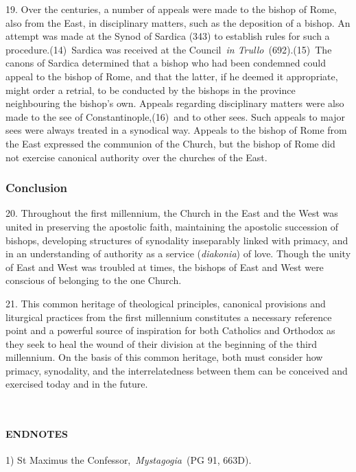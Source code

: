 19. Over the centuries, a number of appeals were made to the bishop of
Rome, also from the East, in disciplinary matters, such as the
deposition of a bishop. An attempt was made at the Synod of Sardica
(343) to establish rules for such a procedure.(14)~Sardica was received
at the Council~\emph{in Trullo~}(692).(15)~The canons of Sardica
determined that a bishop who had been condemned could appeal to the
bishop of Rome, and that the latter, if he deemed it appropriate, might
order a retrial, to be conducted by the bishops in the province
neighbouring the bishop's own. Appeals regarding disciplinary matters
were also made to the see of Constantinople,(16)~and to other sees. Such
appeals to major sees were always treated in a synodical way. Appeals to
the bishop of Rome from the East expressed the communion of the Church,
but the bishop of Rome did not exercise canonical authority over the
churches of the East.

\subsubsection{Conclusion}\label{conclusion}

20. Throughout the first millennium, the Church in the East and the West
was united in preserving the apostolic faith, maintaining the apostolic
succession of bishops, developing structures of synodality inseparably
linked with primacy, and in an understanding of authority as a service
(\emph{diakonia}) of love. Though the unity of East and West was
troubled at times, the bishops of East and West were conscious of
belonging to the one Church.

21. This common heritage of theological principles, canonical provisions
and liturgical practices from the first millennium constitutes a
necessary reference point and a powerful source of inspiration for both
Catholics and Orthodox as they seek to heal the wound of their division
at the beginning of the third millennium. On the basis of this common
heritage, both must consider how primacy, synodality, and the
interrelatedness between them can be conceived and exercised today and
in the future.

~

\paragraph{ENDNOTES}\label{endnotes}

1) St Maximus the Confessor,~\emph{Mystagogia~}(PG 91, 663D).

